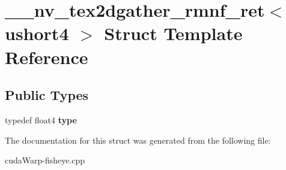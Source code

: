 \hypertarget{struct____nv__tex2dgather__rmnf__ret_3_01ushort4_01_4}{}\section{\+\_\+\+\_\+nv\+\_\+tex2dgather\+\_\+rmnf\+\_\+ret$<$ ushort4 $>$ Struct Template Reference}
\label{struct____nv__tex2dgather__rmnf__ret_3_01ushort4_01_4}
\subsection*{Public Types}
\begin{DoxyCompactItemize}
\item 
typedef float4 {\bfseries type}\hypertarget{struct____nv__tex2dgather__rmnf__ret_3_01ushort4_01_4_a3d48a9a0ee98aacd9245b6874c77a1fd}{}\label{struct____nv__tex2dgather__rmnf__ret_3_01ushort4_01_4_a3d48a9a0ee98aacd9245b6874c77a1fd}

\end{DoxyCompactItemize}


The documentation for this struct was generated from the following file\+:\begin{DoxyCompactItemize}
\item 
cuda\+Warp-\/fisheye.\+cpp\end{DoxyCompactItemize}
